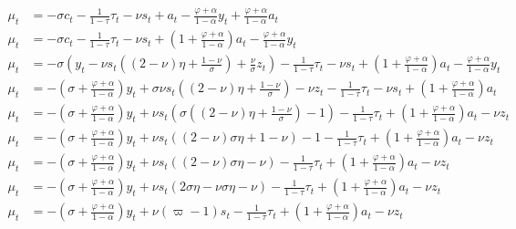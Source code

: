 \begin{align}
   \mu_t &= -\sigma c_t - \frac{1}{1-\tau}\tau_t - \nu s_t + a_t -\frac{\varphi + \alpha}{1-\alpha}y_t + \frac{\varphi + \alpha}{1-\alpha}a_t\\
   \mu_t &= -\sigma c_t - \frac{1}{1-\tau}\tau_t - \nu s_t + \left(1 + \frac{\varphi + \alpha}{1-\alpha}\right)a_t -\frac{\varphi + \alpha}{1-\alpha}y_t \\
   \mu_t &= -\sigma \left(y_t - \nu s_t \left( (2-\nu)\eta + \frac{1-\nu}{\sigma}\right) + \frac{\nu}{\sigma}z_t\right) - \frac{1}{1-\tau}\tau_t - \nu s_t + \left(1 + \frac{\varphi + \alpha}{1-\alpha}\right)a_t -\frac{\varphi + \alpha}{1-\alpha}y_t \\
   \mu_t &= -\left(\sigma + \frac{\varphi + \alpha}{1-\alpha}\right)y_t + \sigma \nu s_t \left( (2-\nu)\eta + \frac{1-\nu}{\sigma}\right) - \nu z_t- \frac{1}{1-\tau}\tau_t - \nu s_t + \left(1 + \frac{\varphi + \alpha}{1-\alpha}\right)a_t \\
   \mu_t &= -\left(\sigma + \frac{\varphi + \alpha}{1-\alpha}\right)y_t + \nu s_t \left(\sigma  \left( (2-\nu)\eta + \frac{1-\nu}{\sigma}\right)- 1 \right) - \frac{1}{1-\tau}\tau_t  + \left(1 + \frac{\varphi + \alpha}{1-\alpha}\right)a_t - \nu z_t\\
   \mu_t &= -\left(\sigma + \frac{\varphi + \alpha}{1-\alpha}\right)y_t + \nu s_t \left( (2-\nu)\sigma \eta + {1-\nu}\right)- 1 - \frac{1}{1-\tau}\tau_t  + \left(1 + \frac{\varphi + \alpha}{1-\alpha}\right)a_t - \nu z_t\\
   \mu_t &= -\left(\sigma + \frac{\varphi + \alpha}{1-\alpha}\right)y_t + \nu s_t \left( (2-\nu)\sigma \eta -\nu\right) - \frac{1}{1-\tau}\tau_t  + \left(1 + \frac{\varphi + \alpha}{1-\alpha}\right)a_t - \nu z_t\\
   \mu_t &= -\left(\sigma + \frac{\varphi + \alpha}{1-\alpha}\right)y_t + \nu s_t \left( 2\sigma \eta-\nu\sigma \eta -\nu\right) - \frac{1}{1-\tau}\tau_t  + \left(1 + \frac{\varphi + \alpha}{1-\alpha}\right)a_t - \nu z_t\\
   \mu_t &= -\left(\sigma + \frac{\varphi + \alpha}{1-\alpha}\right)y_t + \nu (\varpi - 1) s_t - \frac{1}{1-\tau}\tau_t  + \left(1 + \frac{\varphi + \alpha}{1-\alpha}\right)a_t - \nu z_t
\end{align}

